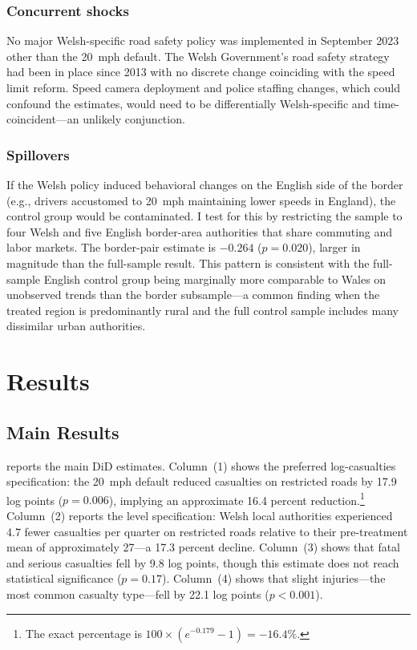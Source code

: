 \documentclass[12pt]{article}
\begin{document}
\subsubsection*{Concurrent shocks} No major Welsh-specific road safety policy was implemented in September 2023 other than the 20~mph default. The Welsh Government's road safety strategy had been in place since 2013 with no discrete change coinciding with the speed limit reform. Speed camera deployment and police staffing changes, which could confound the estimates, would need to be differentially Welsh-specific and time-coincident---an unlikely conjunction.

\subsubsection*{Spillovers} If the Welsh policy induced behavioral changes on the English side of the border (e.g., drivers accustomed to 20~mph maintaining lower speeds in England), the control group would be contaminated. I test for this by restricting the sample to four Welsh and five English border-area authorities that share commuting and labor markets. The border-pair estimate is $-0.264$ ($p = 0.020$), larger in magnitude than the full-sample result. This pattern is consistent with the full-sample English control group being marginally more comparable to Wales on unobserved trends than the border subsample---a common finding when the treated region is predominantly rural and the full control sample includes many dissimilar urban authorities.

\section{Results}
\label{sec:results}

\subsection{Main Results}



 reports the main DiD estimates. Column~(1) shows the preferred log-casualties specification: the 20~mph default reduced casualties on restricted roads by 17.9 log points ($p = 0.006$), implying an approximate 16.4 percent reduction.\footnote{The exact percentage is $100 \times (e^{-0.179} - 1) = -16.4\%$.} Column~(2) reports the level specification: Welsh local authorities experienced 4.7 fewer casualties per quarter on restricted roads relative to their pre-treatment mean of approximately 27---a 17.3 percent decline. Column~(3) shows that fatal and serious casualties fell by 9.8 log points, though this estimate does not reach statistical significance ($p = 0.17$). Column~(4) shows that slight injuries---the most common casualty type---fell by 22.1 log points ($p < 0.001$).
\end{document}
